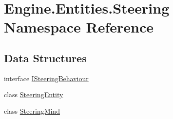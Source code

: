 \hypertarget{a00244}{}\section{Engine.\+Entities.\+Steering Namespace Reference}
\label{a00244}
\subsection*{Data Structures}
\begin{DoxyCompactItemize}
\item 
interface \hyperlink{a00338}{I\+Steering\+Behaviour}
\item 
class \hyperlink{a00342}{Steering\+Entity}
\item 
class \hyperlink{a00346}{Steering\+Mind}
\end{DoxyCompactItemize}
